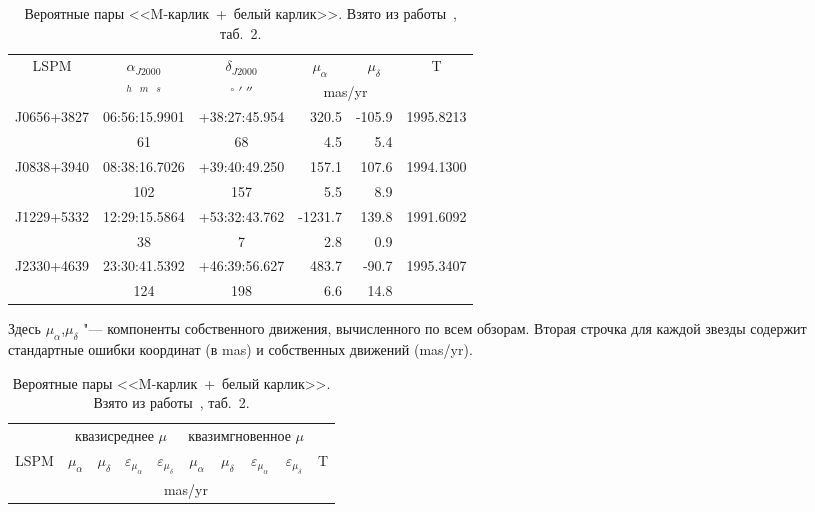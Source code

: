 \begin{table}[t]
\vspace{6mm}
\centering
\caption{Вероятные пары <<M-карлик~+~белый карлик>>. Взято из работы~\cite{2015AstL...41..833K}, таб.~2.}
\label{tab:MDWD}
\vspace{5mm}

\begin{tabularx}{\textwidth}{c|c|c|r|r|c} 
\hline
\multirow{2}{*}{LSPM} & $\alpha_{J2000}$ & $\delta_{J2000}$ &\multicolumn{1}{c|}{$\mu_\alpha$}&\multicolumn{1}{c|}{$\mu_\delta$}& \multirow{2}{*}{T} \\ \cline{2-5}
& $^h$~$^m$~$^s$  & $^\circ~'~''$ & \multicolumn{2}{c|}{mas/yr} & \\ \hline
J0656+3827 & 06:56:15.9901 & +38:27:45.954 &   320.5 & -105.9 & 1995.8213 \\
           & 61            & 68            &     4.5 &    5.4 & \\
J0838+3940 & 08:38:16.7026 & +39:40:49.250 &   157.1 &  107.6 & 1994.1300 \\
           & 102           & 157           &     5.5 &    8.9 & \\
J1229+5332 & 12:29:15.5864 & +53:32:43.762 & -1231.7 &  139.8 & 1991.6092 \\
           & 38            & 7             &     2.8 &    0.9 & \\
J2330+4639 & 23:30:41.5392 & +46:39:56.627 &   483.7 &  -90.7 & 1995.3407 \\
           & 124           & 198           &     6.6 &   14.8 & \\ \hline
\end{tabularx}
\begin{flushleft}
\footnotesize     
Здесь $\mu_\alpha$,$\mu_\delta$ "--- компоненты собственного движения, вычисленного по всем обзорам. Вторая строчка для каждой звезды содержит стандартные ошибки координат (в mas) и собственных движений (mas/yr).
\end{flushleft}
\begin{tabularx}{\textwidth}{l|r|r|r|r|r|r|r|r|c} \hline
     & \multicolumn{4}{c|}{квазисреднее $\mu$ }
     &\multicolumn{4}{c|}{квазимгновенное $\mu$}&  \\ \cline{2-9}
\multicolumn{1}{c|}{LSPM}&\multicolumn{1}{c|}{$\mu_\alpha$}&\multicolumn{1}{c|}{$\mu_\delta$}&\multicolumn{1}{c|}{$\varepsilon_{\mu_\alpha}$}&\multicolumn{1}{c|}{$\varepsilon_{\mu_\delta}$}
	 &\multicolumn{1}{c|}{$\mu_\alpha$}&\multicolumn{1}{c|}{$\mu_\delta$}&\multicolumn{1}{c|}{$\varepsilon_{\mu_\alpha}$}&\multicolumn{1}{c|}{$\varepsilon_{\mu_\delta}$}
	 &   T\\ \cline{2-9} 
     &\multicolumn{8}{c|}{mas/yr}&\\ \hline


\end{tabularx}
\end{table}
